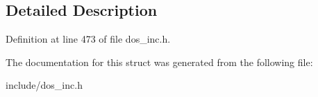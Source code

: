 \subsection{Detailed Description}


Definition at line 473 of file dos\-\_\-inc.\-h.



The documentation for this struct was generated from the following file\-:\begin{DoxyCompactItemize}
\item 
include/dos\-\_\-inc.\-h\end{DoxyCompactItemize}
